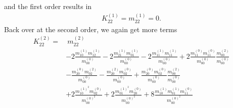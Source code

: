 and the first order results in
\begin{equation}
  \begin{aligned}
    K_{22}^{(1)} = m_{22}^{(1)} =  0.
  \end{aligned}
\end{equation}
Back over at the second order, we again get more terms
\begin{equation}
  \begin{aligned}
    K_{22}^{(2)}
    = &\
    m_{22}^{(2)}
    \\&
    - 2 \frac{ m_{10}^{(1)} m_{12}^{(1)} }{m_{00}^{(0)}}
    - 2 \frac{ m_{21}^{(1)} m_{01}^{(1)} }{m_{00}^{(0)}}
    - 2 \frac{ m_{11}^{(1)} m_{11}^{(1)} }{m_{00}^{(0)}}
    + 2 \frac{ m_{11}^{(0)} m_{11}^{(0)} }{m_{00}^{(0)}}\frac{ m_{00}^{(2)} }{m_{00}^{(0)}}
    \\&
    - \frac{ m_{20}^{(0)} m_{02}^{(2)} }{m_{00}^{(0)}}
    - \frac{ m_{20}^{(2)} m_{02}^{(0)} }{m_{00}^{(0)}}
    + \frac{ m_{20}^{(0)} m_{02}^{(0)} }{m_{00}^{(0)}}\frac{ m_{00}^{(2)} }{m_{00}^{(0)}}
    \\&
    + 2 \frac{ m_{10}^{{(1)}^2} m_{02}^{(0)} }{m_{00}^{{(0)}^2}}
    + 2 \frac{ m_{01}^{{(1)}^2} m_{20}^{(0)} }{m_{00}^{{(0)}^2}}
    + 8 \frac{ m_{10}^{(1)}m_{01}^{(1)} m_{11}^{(0)} }{m_{00}^{{(0)}^2}}
  \end{aligned}
\end{equation}

